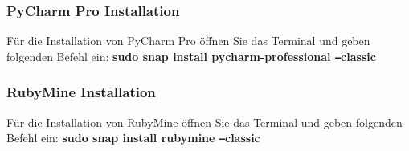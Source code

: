 \subsubsection{PyCharm Pro Installation}\label{subsubsec:pycharmpro}
\begin{frame}[fragile]
    Für die Installation von PyCharm Pro öffnen Sie das Terminal und geben folgenden Befehl ein:\newline
    \textbf{sudo snap install pycharm-professional \texttt{--}classic}
\end{frame}

\subsubsection{RubyMine Installation}\label{subsubsec:RubyMine}
\begin{frame}[fragile]
    Für die Installation von RubyMine öffnen Sie das Terminal und geben folgenden Befehl ein:\newline
    \textbf{sudo snap install rubymine \texttt{--}classic}
\end{frame}